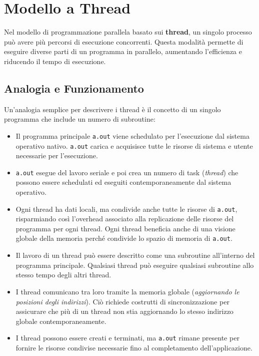 \section{Modello a Thread}
Nel modello di programmazione parallela basato sui
\textbf{thread}, un singolo processo può avere più
percorsi di esecuzione concorrenti. Questa modalità
permette di eseguire diverse parti di un programma
in parallelo, aumentando l'efficienza e riducendo
il tempo di esecuzione.

\subsection{Analogia e Funzionamento}
Un'analogia semplice per descrivere i thread è il concetto
di un singolo programma che include un numero di subroutine:
\begin{itemize}
    \item Il programma principale \texttt{a.out} viene
    schedulato per l'esecuzione dal sistema operativo
    nativo. \texttt{a.out} carica e acquisisce tutte le
    risorse di sistema e utente necessarie per l'esecuzione.
    \item \texttt{a.out} esegue del lavoro seriale e poi
    crea un numero di task (\textit{thread}) che possono
    essere
    schedulati ed eseguiti contemporaneamente dal sistema
    operativo.
    \item Ogni thread ha dati locali, ma condivide anche
    tutte le risorse di \texttt{a.out}, risparmiando così
    l'overhead associato alla replicazione delle risorse
    del programma per ogni thread. Ogni thread beneficia
    anche di una visione globale della memoria perché
    condivide lo spazio di memoria di \texttt{a.out}.
    \item Il lavoro di un thread può essere descritto
    come una subroutine all'interno del programma
    principale. Qualsiasi thread può eseguire qualsiasi
    subroutine allo stesso tempo degli altri thread.
    \item I thread comunicano tra loro tramite la memoria
    globale (\textit{aggiornando le posizioni degli indirizzi}).
    Ciò richiede costrutti di sincronizzazione per
    assicurare che più di un thread non stia aggiornando
    lo stesso indirizzo globale contemporaneamente.
    \item I thread possono essere creati e terminati,
    ma \texttt{a.out} rimane presente per fornire le
    risorse condivise necessarie fino al completamento
    dell'applicazione.
\end{itemize}

